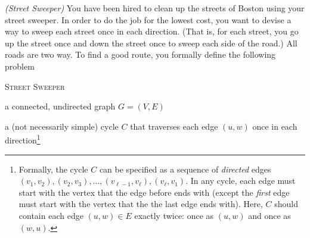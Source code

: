 \documentclass[11pt]{article}
\begin{document}
\exercise\label{graphs: exercise: street sweeper} \emph{(Street Sweeper)}
You have been hired to clean up the streets of Boston using your street sweeper.  In order to do the job for the lowest cost, you want to devise a way to sweep each street once in each direction.  (That is, for each street, you go up the street once and down the street once to sweep each side of the road.)  All roads are two way.  To find a good route,
you formally define the following problem
\begin{mylist}
\item[]\textsc{Street Sweeper} \dotfill
\item[\bf input:] a connected, undirected graph $G = (V,E)$
\item[\bf output:] a (not necessarily simple) cycle $C$ that traverses each edge $(u, w)$ once in each direction\footnote{
    Formally, the cycle $C$ can be specified as a sequence of \emph{directed}
    edges $(v_1, v_2), (v_2, v_3), \ldots, (v_{\ell-1}, v_\ell), (v_\ell, v_1)$.
    In any cycle, each edge must start with the vertex that the edge before ends with
    (except the \emph{first} edge must start with the vertex that the the last edge ends with).
    Here, $C$ should contain each edge $(u,w)\in E$ exactly twice: once as $(u,w)$ and once as $(w, u)$.
  }    
\end{mylist}
\end{document}
